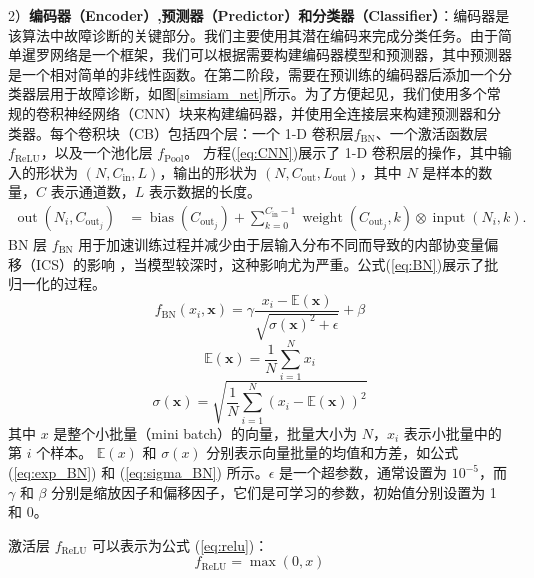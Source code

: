 \documentclass[master]{thesis-uestc}
\begin{document}
2）\textbf{编码器（Encoder）,预测器（Predictor）和分类器（Classifier）}：编码器是该算法中故障诊断的关键部分。我们主要使用其潜在编码来完成分类任务。由于简单暹罗网络是一个框架，我们可以根据需要构建编码器模型和预测器，其中预测器是一个相对简单的非线性函数。在第二阶段，需要在预训练的编码器后添加一个分类器层用于故障诊断，如图\ref{simsiam_net}所示。为了方便起见，我们使用多个常规的卷积神经网络（CNN）块来构建编码器，并使用全连接层来构建预测器和分类器。每个卷积块（CB）包括四个层：一个 1-D 卷积层\( f_{\text{BN}} \)、一个激活函数层 \( f_{\text{ReLU}} \)，以及一个池化层 \( f_{\text{Pool}} \)。 方程(\ref{eq:CNN})展示了 1-D 卷积层的操作，其中输入的形状为 \( (N, C_{\text{in}}, L) \)，输出的形状为 \( (N, C_{\text{out}}, L_{\text{out}}) \)，其中 \( N \) 是样本的数量，\( C \) 表示通道数，\( L \) 表示数据的长度。
\begin{equation}
    \begin{aligned}
    \operatorname{out}(N_i, C_{\mathrm{out}_j}) &= \operatorname{bias}(C_{\mathrm{out}_j}) + \sum_{k=0}^{C_{\mathrm{in}}-1} \operatorname{weight}(C_{\mathrm{out}_j}, k) \otimes \operatorname{input}(N_i, k).
    \end{aligned}
    \label{eq:CNN}
    \end{equation}
BN 层 \( f_{\text{BN}} \) 用于加速训练过程并减少由于层输入分布不同而导致的内部协变量偏移（ICS）的影响 ，当模型较深时，这种影响尤为严重。公式(\ref{eq:BN})展示了批归一化的过程。
\begin{equation}
    f_{\text{BN}}(x_i, \mathbf{x}) = \gamma \frac{x_i - \mathbb{E}(\mathbf{x})}{\sqrt{\sigma(\mathbf{x})^2 + \epsilon}} + \beta
\label{eq:BN}
\end{equation}    
\begin{equation}
\mathbb{E}(\mathbf{x}) = \frac{1}{N}\sum_{i=1}^N x_i
\label{eq:exp_BN}
\end{equation}
\begin{equation}
\sigma(\mathbf{x}) = \sqrt{\frac{1}{N}\sum_{i=1}^N (x_i - \mathbb{E}(\mathbf{x}))^2}
\label{eq:sigma_BN}
\end{equation}
其中 \( x \) 是整个小批量（mini batch）的向量，批量大小为 \( N \)，\( x_i \) 表示小批量中的第 \( i \) 个样本。  
\( \mathbb{E}(x) \) 和 \( \sigma(x) \) 分别表示向量批量的均值和方差，如公式 (\ref{eq:exp_BN}) 和 (\ref{eq:sigma_BN}) 所示。\( \epsilon \) 是一个超参数，通常设置为 \( 10^{-5} \)，而 \( \gamma \) 和 \( \beta \) 分别是缩放因子和偏移因子，它们是可学习的参数，初始值分别设置为 1 和 0。

激活层 \( f_{\text{ReLU}} \) 可以表示为公式 (\ref{eq:relu})：
\begin{equation}
    f_{\text{ReLU}} = \max(0, x)
    \label{eq:relu}
\end{equation}
\end{document}
